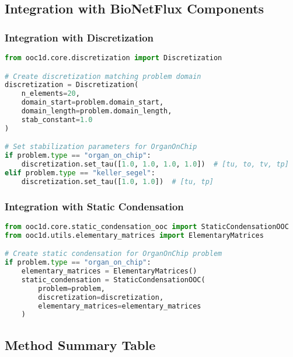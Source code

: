 \subsection{Integration with BioNetFlux Components}
\label{subsec:bionetflux_integration_examples}

\subsubsection{Integration with Discretization}

\begin{lstlisting}[language=Python, caption=Discretization Integration]
from ooc1d.core.discretization import Discretization

# Create discretization matching problem domain
discretization = Discretization(
    n_elements=20,
    domain_start=problem.domain_start,
    domain_length=problem.domain_length,
    stab_constant=1.0
)

# Set stabilization parameters for OrganOnChip
if problem.type == "organ_on_chip":
    discretization.set_tau([1.0, 1.0, 1.0, 1.0])  # [tu, to, tv, tp]
elif problem.type == "keller_segel":
    discretization.set_tau([1.0, 1.0])  # [tu, tp]
\end{lstlisting}

\subsubsection{Integration with Static Condensation}

\begin{lstlisting}[language=Python, caption=Static Condensation Integration]
from ooc1d.core.static_condensation_ooc import StaticCondensationOOC
from ooc1d.utils.elementary_matrices import ElementaryMatrices

# Create static condensation for OrganOnChip problem
if problem.type == "organ_on_chip":
    elementary_matrices = ElementaryMatrices()
    static_condensation = StaticCondensationOOC(
        problem=problem,
        discretization=discretization,
        elementary_matrices=elementary_matrices
    )
\end{lstlisting}

\subsection{Method Summary Table}
\label{subsec:method_summary}

